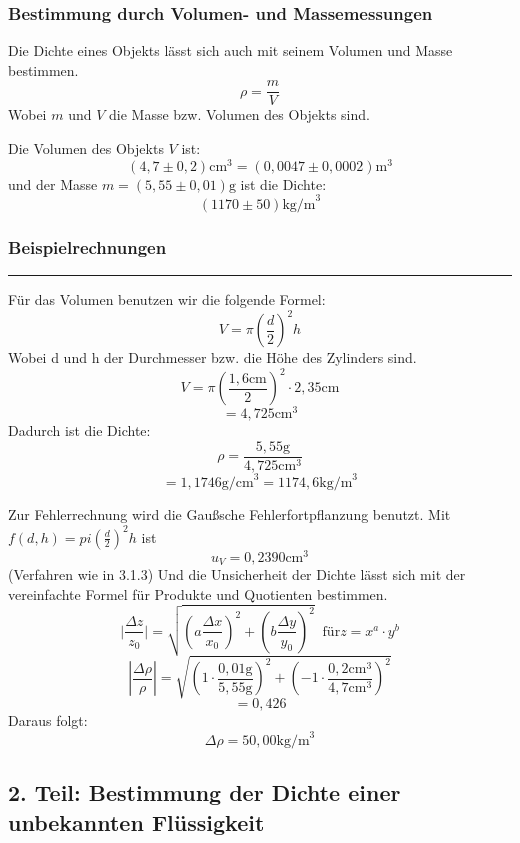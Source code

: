 \documentclass[11pt,a4paper]{article} %
\begin{document}
\subsubsection{Bestimmung durch Volumen- und Massemessungen}

Die Dichte eines Objekts lässt sich auch mit seinem Volumen und Masse bestimmen. 
\begin{equation}
\rho=\frac{m}{V}
\end{equation}
Wobei $m$ und $V$ die Masse bzw. Volumen des Objekts sind. 

Die Volumen des Objekts $V$ ist:
$$(4,7\pm0,2) \textrm{cm}^3 = (0,0047 \pm 0,0002) \textrm{m}^3$$
und der Masse $m=(5,55\pm0,01)\textrm{g}$ ist die Dichte:
$$(1170 \pm 50) \textrm{kg/m}^3$$
\subsubsection{Beispielrechnungen}

\hrule
\begin{tcolorbox}[colback=white]
Für das Volumen benutzen wir die folgende Formel:
$$V = \pi (\frac{d}{2})^2 h$$
Wobei d und h der Durchmesser bzw. die Höhe des Zylinders sind. 
$$V = \pi (\frac{1,6\textrm{cm}}{2})^2\cdot2,35\textrm{cm}$$
$$ = 4,725 \textrm{cm}^3$$
Dadurch ist die Dichte:
$$\rho=\frac{5,55\textrm{g}}{4,725\textrm{cm}^3}$$
$$=1,1746\textrm{g/cm}^3=1174,6\textrm{kg/m}^3$$

Zur Fehlerrechnung wird die Gaußsche Fehlerfortpflanzung benutzt. Mit $f(d,h)=pi(\frac{d}{2})^2h$ ist
$$u_V = 0,2390 \textrm{cm}^3$$
(Verfahren wie in 3.1.3)
Und die Unsicherheit der Dichte lässt sich mit der vereinfachte Formel für Produkte und Quotienten bestimmen. 
\begin{equation}
\vert\frac{\Delta z}{z_0}\vert = \sqrt{(a\frac{\Delta x}{x_0})^2+(b\frac{\Delta y}{y_0})^2} \; \; \textrm{für} z=x^a\cdot y^b
\end{equation}
$$|\frac{\Delta\rho}{\rho}|=\sqrt{(1\cdot\frac{0,01\textrm{g}}{5,55\textrm{g}})^2+(-1\cdot\frac{0,2\textrm{cm}^3}{4,7\textrm{cm}^3})^2}$$
$$=0,426$$
Daraus folgt:
$$\Delta\rho=50,00\textrm{kg/m}^3$$
\end{tcolorbox}

\newpage
\subsection{2. Teil: Bestimmung der Dichte einer unbekannten Flüssigkeit}
\end{document}
